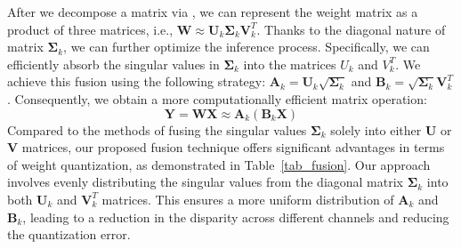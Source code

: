 After we decompose a matrix via \asvd, we can represent the weight matrix as a product of three matrices, i.e., $\mathbf{W} \approx \mathbf{U}_k \mathbf{\Sigma}_k \mathbf{V}_k^T$. 
Thanks to the diagonal nature of matrix $\mathbf{\Sigma}_k$, we can further optimize the inference process. 
Specifically, we can efficiently absorb the singular values in $\mathbf{\Sigma}_k$ into the matrices $U_k$ and $V_k^T$. We achieve this fusion using the following strategy: $\mathbf{A}_k = \mathbf{U}_k\sqrt{\mathbf{\Sigma}_k}$ and $\mathbf{B}_k = \sqrt{\mathbf{\Sigma}_k}\mathbf{V}_k^T$. Consequently, we obtain a more computationally efficient matrix operation: 
\begin{equation}
    \mathbf{Y}=\mathbf{W}\mathbf{X} \approx \mathbf{A}_k (\mathbf{B}_k\mathbf{X})
\end{equation}
Compared to the methods of fusing the singular values $\mathbf{\Sigma}_k$ solely into either $\mathbf{U}$ or $\mathbf{V}$ matrices, our proposed fusion technique offers significant advantages in terms of weight quantization, as demonstrated in Table~\ref{tab_fusion}. Our approach involves evenly distributing the singular values from the diagonal matrix $\mathbf{\Sigma}_k$ into both $\mathbf{U}_k$ and $\mathbf{V}_k^T$ matrices. This ensures a more uniform distribution of $\mathbf{A}_k$ and $\mathbf{B}_k$, leading to a reduction in the disparity across different channels and reducing the quantization error.






